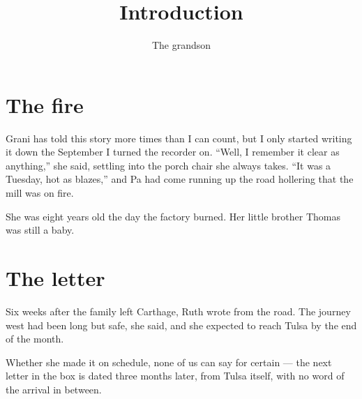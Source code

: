 \documentclass[11pt]{article}
\title{Introduction}
\author{The grandson}
\date{}
\begin{document}
\maketitle

\section*{The fire}

Grani has told this story more times than I can count, but I only started
writing it down the September I turned the recorder on. ``Well, I remember
it clear as anything,'' she said, settling into the porch chair she always
takes. ``It was a Tuesday, hot as blazes,'' and Pa had come running up the
road hollering that the mill was on fire.

She was eight years old the day the factory burned. Her little brother
Thomas was still a baby.

\section*{The letter}

Six weeks after the family left Carthage, Ruth wrote from the road. The
journey west had been long but safe, she said, and she expected to reach
Tulsa by the end of the month.

Whether she made it on schedule, none of us can say for certain — the
next letter in the box is dated three months later, from Tulsa itself,
with no word of the arrival in between.
\end{document}

